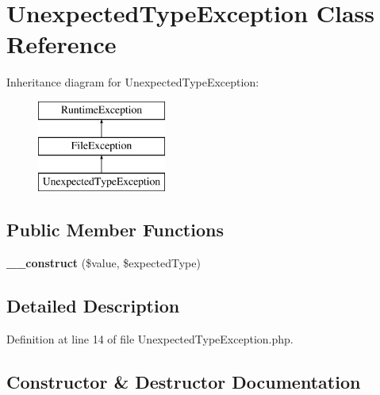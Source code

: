 \section{Unexpected\+Type\+Exception Class Reference}
\label{class_symfony_1_1_component_1_1_http_foundation_1_1_file_1_1_exception_1_1_unexpected_type_exception}
Inheritance diagram for Unexpected\+Type\+Exception\+:\begin{figure}[H]
\begin{center}
\leavevmode
\includegraphics[height=3.000000cm]{class_symfony_1_1_component_1_1_http_foundation_1_1_file_1_1_exception_1_1_unexpected_type_exception}
\end{center}
\end{figure}
\subsection*{Public Member Functions}
\begin{DoxyCompactItemize}
\item 
{\bf \+\_\+\+\_\+construct} (\$value, \$expected\+Type)
\end{DoxyCompactItemize}


\subsection{Detailed Description}


Definition at line 14 of file Unexpected\+Type\+Exception.\+php.



\subsection{Constructor \& Destructor Documentation}
